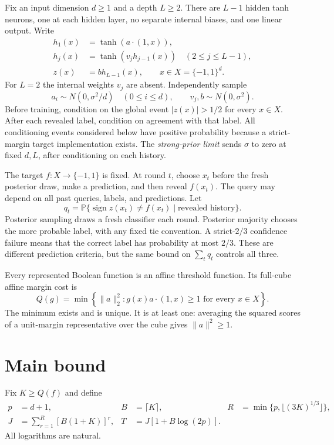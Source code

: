 \documentclass[11pt]{article}
\newcommand{\Pp}{\mathbb P}
\newcommand{\sgn}{\operatorname{sign}}
\begin{document}
Fix an input dimension $d\ge1$ and a depth $L\ge2$. There are $L-1$ hidden tanh neurons, one at each hidden layer, no separate internal biases, and one linear output. Write
\begin{align}
 h_1(x)&=\tanh(a\cdot(1,x)),\\
 h_j(x)&=\tanh(v_jh_{j-1}(x))\quad(2\le j\le L-1),\\
 z(x)&=b h_{L-1}(x),\qquad x\in X=\{-1,1\}^d.
\end{align}
For $L=2$ the internal weights $v_j$ are absent. Independently sample
\[
 a_i\sim N(0,\sigma^2/d)\quad(0\le i\le d),\qquad
 v_j,b\sim N(0,\sigma^2).
\]
Before training, condition on the global event $|z(x)|>1/2$ for every $x\in X$. After each revealed label, condition on agreement with that label. All conditioning events considered below have positive probability because a strict-margin target implementation exists. The \emph{strong-prior limit} sends $\sigma$ to zero at fixed $d,L$, after conditioning on each history.

The target $f:X\to\{-1,1\}$ is fixed. At round $t$, choose $x_t$ before the fresh posterior draw, make a prediction, and then reveal $f(x_t)$. The query may depend on all past queries, labels, and predictions. Let
\[
 q_t=\Pp\{\sgn z(x_t)\ne f(x_t)\mid\text{revealed history}\}.
\]
Posterior sampling draws a fresh classifier each round. Posterior majority chooses the more probable label, with any fixed tie convention. A strict-$2/3$ confidence failure means that the correct label has probability at most $2/3$. These are different prediction criteria, but the same bound on $\sum_tq_t$ controls all three.

Every represented Boolean function is an affine threshold function. Its full-cube affine margin cost is
\begin{equation}\label{eq:Q}
 Q(g)=\min\left\{\|a\|_2^2:
 g(x)a\cdot(1,x)\ge1\text{ for every }x\in X\right\}.
\end{equation}
The minimum exists and is unique. It is at least one: averaging the squared scores of a unit-margin representative over the cube gives $\|a\|^2\ge1$.

\section{Main bound}
Fix $K\ge Q(f)$ and define
\begin{align}
 p&=d+1,& B&=\lceil K\rceil,&
 R&=\min\{p,\lfloor(3K)^{1/3}\rfloor\},\\
 J&=\sum_{r=1}^R[B(1+K)]^r,&
 T&=J[1+B\log(2p)].&&\label{eq:budget}
\end{align}
All logarithms are natural.
\end{document}
